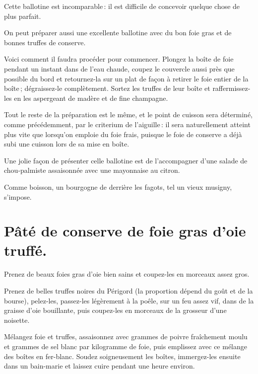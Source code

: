 Cette ballotine est incomparable : il est difficile de concevoir quelque chose
de plus parfait.

\sk

On peut préparer aussi une excellente ballotine avec du bon foie gras et de
bonnes truffes de conserve.

Voici comment il faudra procéder pour commencer. Plongez la boîte de foie
pendant un instant dans de l’eau chaude, coupez le couvercle aussi près que
possible du bord et retournez-la sur un plat de façon à retirer le foie entier
de la boîte ; dégraissez-le complètement. Sortez les truffes de leur boîte et
raffermissez-les en les aspergeant de madère et de fine champagne.

Tout le reste de la préparation est le même, et le point de cuisson sera
déterminé, comme précédemment, par le criterium de l'aiguille : il sera
naturellement atteint plus vite que lorsqu'on emploie du foie frais, puisque le
foie de conserve a déjà subi une cuisson lors de sa mise en boîte.

\sk

Une jolie façon de présenter celle ballotine est de l'accompagner d'une salade
de chou-palmiste assaisonnée avec une mayonnaise au citron.

Comme boisson, un bourgogne de derrière les fagots, tel un vieux musigny,
s'impose.

\section*{\centering Pâté de conserve de foie gras d’oie truffé.}
{}


Prenez de beaux foies gras d'oie bien sains et coupez-les en morceaux assez
gros.

Prenez de belles truffes noires du Périgord (la proportion dépend du goût et de
la bourse), pelez-les, passez-les légèrement à la poêle, sur un feu assez vif,
dans de la graisse d'oie bouillante, puis coupez-les en morceaux de la grosseur
d'une noisette.

Mélangez foie et truffes, assaisonnez avec {\mmm} grammes de poivre fraîchement
moulu et {\mmm} grammes de sel blanc par kilogramme de foie, puis
emplissez avec ce mélange des boîtes en fer-blanc. Soudez soigneusement les
boîtes, immergez-les ensuite dans un bain-marie et laissez cuire pendant une
heure environ.


